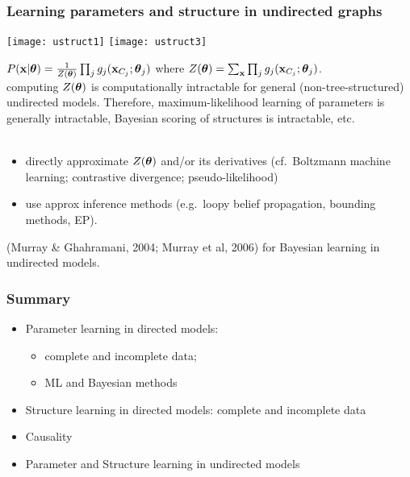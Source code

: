 \begin{frame}
\frametitle{Learning parameters and structure in undirected graphs}

\vspace*{0.7ex}
\centerline{\texttt{[image: ustruct1]} \hspace{3ex} \texttt{[image: ustruct3]}}

\vspace*{1ex}
\hspace{3ex} $P(\mathbf x|\boldsymbol{\theta}) = \frac{1}{Z(\boldsymbol{\theta})} \prod_j g_j(\mathbf x_{C_j};
\boldsymbol{\theta}_j)$  where $Z(\boldsymbol{\theta}) = \sum_\mathbf x \prod_j g_j(\mathbf x_{C_j}; \boldsymbol{\theta}_j)$.\\[1ex]

 computing $Z(\boldsymbol{\theta})$ is computationally
intractable for general (non-tree-structured) undirected models.
Therefore, maximum-likelihood learning of parameters is generally
intractable, Bayesian scoring of structures is intractable, etc.\\[2ex]

 \\[-1ex]
\begin{itemize}
\item directly approximate $Z(\boldsymbol{\theta})$ and/or its derivatives
  (cf.\ Boltzmann machine learning; contrastive divergence;
  pseudo-likelihood) 
\item use approx inference methods (e.g.\ loopy belief
  propagation, bounding methods, EP).
\end{itemize}

{\footnotesize (Murray \& Ghahramani, 2004; Murray et al, 2006)
  for Bayesian learning in undirected models.}

\end{frame}
\begin{frame}
\frametitle{Summary}

\begin{itemize}
\item Parameter learning in directed models: 
\begin{itemize}
\item complete and incomplete data; 
\item 
ML and Bayesian methods
\end{itemize}
\item Structure learning in directed models: complete and incomplete data
\item Causality
\item Parameter and Structure learning in undirected models
\end{itemize}

\end{frame}

